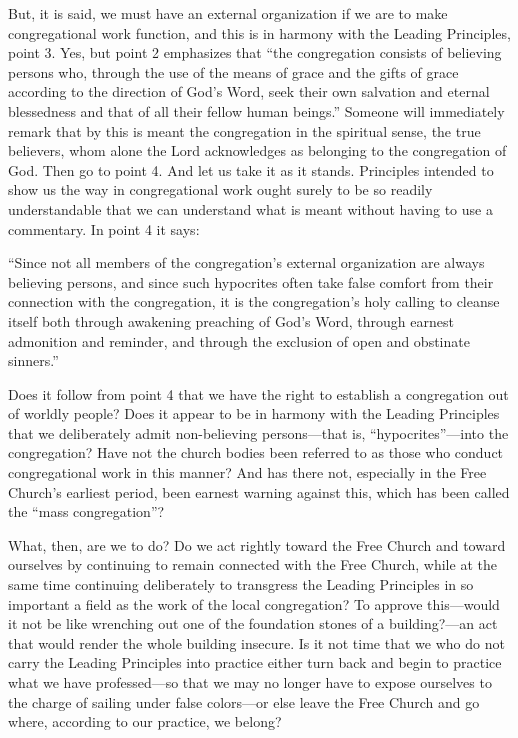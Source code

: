 But, it is said, we must have an external organization if we are to make congregational work function, and this is in harmony with the Leading Principles, point 3. Yes, but point 2 emphasizes that “the congregation consists of believing persons who, through the use of the means of grace and the gifts of grace according to the direction of God’s Word, seek their own salvation and eternal blessedness and that of all their fellow human beings.” Someone will immediately remark that by this is meant the congregation in the spiritual sense, the true believers, whom alone the Lord acknowledges as belonging to the congregation of God. Then go to point 4. And let us take it as it stands. Principles intended to show us the way in congregational work ought surely to be so readily understandable that we can understand what is meant without having to use a commentary. In point 4 it says:

“Since not all members of the congregation’s external organization are always believing persons, and since such hypocrites often take false comfort from their connection with the congregation, it is the congregation’s holy calling to cleanse itself both through awakening preaching of God’s Word, through earnest admonition and reminder, and through the exclusion of open and obstinate sinners.”

Does it follow from point 4 that we have the right to establish a congregation out of worldly people? Does it appear to be in harmony with the Leading Principles that we deliberately admit non-believing persons—that is, “hypocrites”—into the congregation? Have not the church bodies been referred to as those who conduct congregational work in this manner? And has there not, especially in the Free Church’s earliest period, been earnest warning against this, which has been called the “mass congregation”?

What, then, are we to do? Do we act rightly toward the Free Church and toward ourselves by continuing to remain connected with the Free Church, while at the same time continuing deliberately to transgress the Leading Principles in so important a field as the work of the local congregation? To approve this—would it not be like wrenching out one of the foundation stones of a building?—an act that would render the whole building insecure. Is it not time that we who do not carry the Leading Principles into practice either turn back and begin to practice what we have professed—so that we may no longer have to expose ourselves to the charge of sailing under false colors—or else leave the Free Church and go where, according to our practice, we belong?

